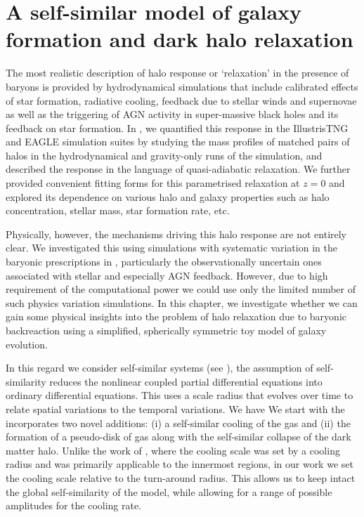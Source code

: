 \chapter{A self-similar model of galaxy formation and dark halo relaxation}
\label{chap:self-sim-relxn}

The most realistic description of halo response or `relaxation' in the presence of baryons is provided by hydrodynamical simulations that include calibrated effects of star formation, radiative cooling, feedback due to stellar winds and supernovae as well as the triggering of AGN activity in super-massive black holes and its feedback on star formation. In , we quantified this response in the IllustrisTNG \citep{2018TNG_Pillepich_etal} and EAGLE \citep{2015Schaye_EAGLE} simulation suites by studying the mass profiles of matched pairs of halos in the hydrodynamical and gravity-only runs of the simulation, and described the response in the language of quasi-adiabatic relaxation. We further provided convenient fitting forms for this parametrised relaxation at $z=0$ and explored its dependence on various halo and galaxy properties such as halo concentration, stellar mass, star formation rate, etc.

Physically, however, the mechanisms driving this halo response are not entirely clear. We investigated this using simulations with systematic variation in the baryonic prescriptions in , particularly the observationally uncertain ones associated with stellar and especially AGN feedback. However, due to high requirement of the computational power we could use only the limited number of such physics variation simulations. In this chapter, we investigate whether we can gain some physical insights into the problem of halo relaxation due to baryonic backreaction using a simplified, spherically symmetric toy model of galaxy evolution.

In this regard we consider self-similar systems (see ), the assumption of self-similarity reduces the nonlinear coupled partial differential equations into ordinary differential equations. This uses a scale radius that evolves over time to relate spatial variations to the temporal variations. We have 
We start with the incorporates two novel additions: (i) a self-similar cooling of the gas and (ii) the formation of a pseudo-disk of gas along with the self-similar collapse of the dark matter halo. Unlike the work of \cite{1989Bertschinger}, where the cooling scale was set by a cooling radius and was primarily applicable to the innermost regions, in our work we set the cooling scale relative to the turn-around radius. This allows us to keep intact the global self-similarity of the model, while allowing for a range of possible amplitudes for the cooling rate.

